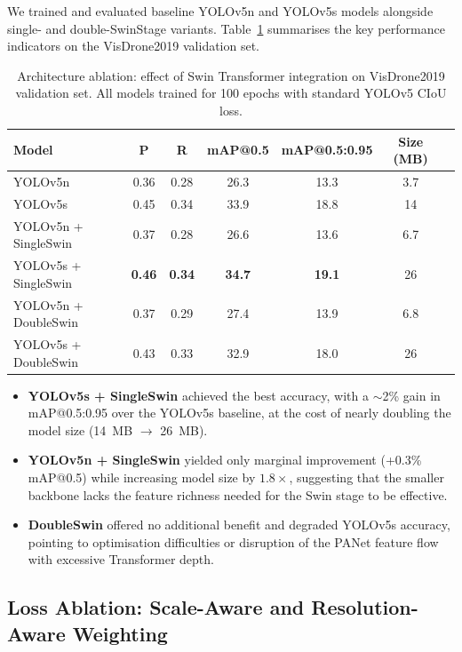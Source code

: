 \documentclass[conference]{IEEEtran}
\begin{document}
We trained and evaluated baseline YOLOv5n and YOLOv5s models alongside
single- and double-SwinStage variants.  Table~\ref{tab:arch_ablation}
summarises the key performance indicators on the VisDrone2019 validation set.

\begin{table}[t]
\centering
\caption{Architecture ablation: effect of Swin Transformer integration on
  VisDrone2019 validation set.  All models trained for 100 epochs with
  standard YOLOv5 CIoU loss.}
\begin{tabular}{lcccccc}
\toprule
\textbf{Model} & \textbf{P} & \textbf{R}
  & \textbf{mAP@0.5} & \textbf{mAP@0.5:0.95} & \textbf{Size (MB)} \\
\midrule
YOLOv5n               & 0.36 & 0.28 & 26.3 & 13.3 & 3.7 \\
YOLOv5s               & 0.45 & 0.34 & 33.9 & 18.8 & 14  \\
YOLOv5n + SingleSwin  & 0.37 & 0.28 & 26.6 & 13.6 & 6.7 \\
YOLOv5s + SingleSwin  & \textbf{0.46} & \textbf{0.34}
                                & \textbf{34.7} & \textbf{19.1} & 26  \\
YOLOv5n + DoubleSwin  & 0.37 & 0.29 & 27.4 & 13.9 & 6.8 \\
YOLOv5s + DoubleSwin  & 0.43 & 0.33 & 32.9 & 18.0 & 26  \\
\bottomrule
\end{tabular}
\label{tab:arch_ablation}
\end{table}

\begin{itemize}
\item \textbf{YOLOv5s + SingleSwin} achieved the best accuracy, with a
  $\sim$2\% gain in mAP@0.5:0.95 over the YOLOv5s baseline, at the cost of
  nearly doubling the model size (14~MB $\to$ 26~MB).
\item \textbf{YOLOv5n + SingleSwin} yielded only marginal improvement (+0.3\%
  mAP@0.5) while increasing model size by $1.8\times$, suggesting that the
  smaller backbone lacks the feature richness needed for the Swin stage to be
  effective.
\item \textbf{DoubleSwin} offered no additional benefit and degraded YOLOv5s
  accuracy, pointing to optimisation difficulties or disruption of the PANet
  feature flow with excessive Transformer depth.
\end{itemize}

\subsection{Loss Ablation: Scale-Aware and Resolution-Aware Weighting}
\end{document}
